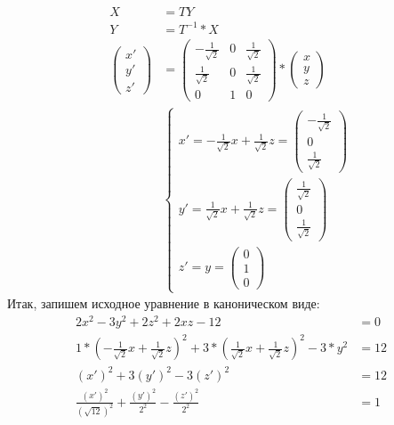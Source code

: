 \documentclass[12pt, a4paper]{article}
\begin{document}
\begin{equation*}
\begin{aligned}
X&=TY\\
Y&=T^{-1}*X\\
\begin{pmatrix}
x'\\
y'\\
z'
\end{pmatrix} &= \begin{pmatrix}
-\frac{1}{\sqrt{2}} & 0  & \frac{1}{\sqrt{2}}\\
\frac{1}{\sqrt{2}} & 0 & \frac{1}{\sqrt{2}}\\
0 & 1 & 0
\end{pmatrix} * \begin{pmatrix}
x\\
y\\
z
\end{pmatrix}\\
&\begin{cases}
x' = -\frac{1}{\sqrt{2}}x + \frac{1}{\sqrt{2}} z = \begin{pmatrix}
-\frac{1}{\sqrt{2}}\\
0\\
\frac{1}{\sqrt{2}}
\end{pmatrix}\\
y' = \frac{1}{\sqrt{2}}x + \frac{1}{\sqrt{2}} z = \begin{pmatrix}
\frac{1}{\sqrt{2}}\\
0\\
\frac{1}{\sqrt{2}}
\end{pmatrix}\\
z' = y = \begin{pmatrix}
0\\
1\\
0
\end{pmatrix}
\end{cases}
\end{aligned}
\end{equation*}
Итак, запишем исходное уравнение в каноническом виде:
\begin{equation*}
\begin{aligned}
2x^2-3y^2+2z^2+2xz-12&=0\\
1*(-\frac{1}{\sqrt{2}}x + \frac{1}{\sqrt{2}}z)^2 + 3*(\frac{1}{\sqrt{2}}x + \frac{1}{\sqrt{2}}z)^2 - 3*y^2 &= 12\\
(x')^2 + 3(y')^2 -3(z')^2 &= 12\\
\frac{(x')^2}{(\sqrt{12})^2} + \frac{(y')^2}{2^2} -\frac{(z')^2}{2^2} &= 1\\
\end{aligned}
\end{equation*}
\end{document}
